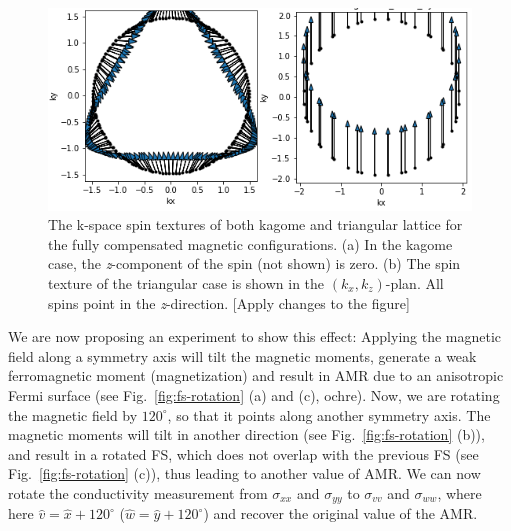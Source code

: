 \documentclass[prb,showpacs,amsmath,amssymb,superscriptaddress,twocolumn,floatfix]{revtex4-1}
\begin{document}
\begin{appendix}
\begin{figure}
	\centering
	\includegraphics[width=1\linewidth]{img/Combined_Spintexture}
	\caption{The k-space spin textures of both kagome and triangular lattice for the fully compensated magnetic configurations. (a) In the kagome case, the \textit{z}-component of the spin (not shown) is zero. (b) The spin texture of the triangular case is shown in the $(k_x, k_z)$-plan. All spins point in the \textit{z}-direction. {\color{red}[Apply changes to the figure]}}
	\label{fig:combinedspintexture}
\end{figure}

We are now proposing an experiment to show this effect: Applying the magnetic field along a symmetry axis will tilt the magnetic moments, generate a weak ferromagnetic moment (magnetization) and result in AMR due to an anisotropic Fermi surface (see Fig.~\ref{fig:fs-rotation} (a) and (c), ochre). Now, we are rotating the magnetic field by $120^\circ$, so that it points along another symmetry axis. The magnetic moments will tilt in another direction (see Fig.~\ref{fig:fs-rotation} (b)), and result in a rotated FS, which does not overlap with the previous FS (see Fig.~\ref{fig:fs-rotation} (c)), thus leading to another value of AMR. We can now rotate the conductivity measurement from $\sigma_{xx}$ and $\sigma_{yy}$ to $\sigma_{vv}$ and $\sigma_{ww}$, where here $\hat{v} = \hat{x} + 120^\circ$ ($\hat{w} = \hat{y} + 120^\circ$) and recover the original value of the AMR. 


\end{appendix}
\end{document}
